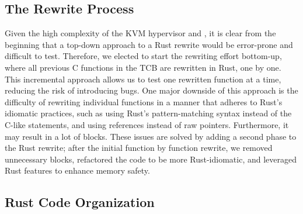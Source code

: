 \subsection{The Rewrite Process}
Given the high complexity of the KVM hypervisor and \secore{},
it is clear from the beginning that
a top-down approach to a Rust rewrite would be error-prone and difficult to test.
Therefore, we elected to start the rewriting effort bottom-up,
where all previous C functions in the TCB are rewritten in Rust, one by one.
This incremental approach allows us to test one rewritten function at a time,
reducing the risk of introducing bugs.
One major downside of this approach is the difficulty of rewriting individual
functions in a manner that adheres to Rust's idiomatic practices, such as using
Rust's pattern-matching  syntax instead of the C-like 
statements, and using references instead of raw pointers.
Furthermore, it may result in a lot of  blocks.
These issues are solved by adding a second phase to the Rust rewrite;
after the initial function by function rewrite, we removed unnecessary
 blocks, refactored the code to be more Rust-idiomatic,
and leveraged Rust features to enhance \rustcore{} memory safety.

\subsection{Rust Code Organization}
\label{sec:RCO}

